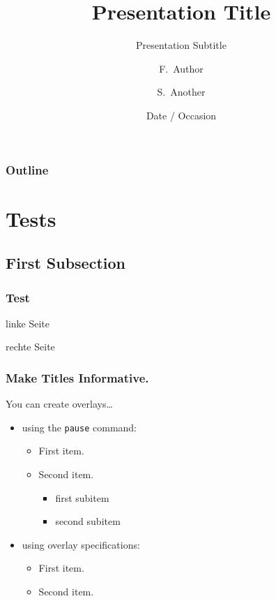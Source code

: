 \documentclass{beamer}
\title[Short Paper Title] %
{Presentation Title}
\subtitle{Presentation Subtitle} %
\author[Author, Another] %
{F.~Author\inst{1} \and S.~Another\inst{2}}
\institute[Universities of Somewhere and Elsewhere] %
{
  \inst{1}%
  Department of Computer Science\\
  University of Somewhere
  \and
  \inst{2}%
  Department of Theoretical Philosophy\\
  University of Elsewhere}
\date[Short Occasion] %
{Date / Occasion}
\begin{document}
\maketitle

\begin{frame}
  \frametitle{Outline}
  \tableofcontents
\end{frame}

\section{Tests}

\subsection{First Subsection}

\begin{frame}
  \frametitle{Test}
  \begin{minipage}{0.45\textwidth}
    \begin{block}{linke Seite}
      \vspace{3cm}
    \end{block}
  \end{minipage}
  \hfill
  \begin{minipage}{0.45\textwidth}
    \begin{block}{rechte Seite}
      \vspace{4cm}
    \end{block}
  \end{minipage}
\end{frame}

\begin{frame}
  \frametitle{Make Titles Informative.}

  You can create overlays\dots
  \begin{itemize}
  \item using the \texttt{pause} command:
    \begin{itemize}
    \item
      First item.
      \pause
    \item
      Second item.
      \begin{itemize}
        \item first subitem
        \item second subitem
      \end{itemize}
    \end{itemize}
  \item
    using overlay specifications:
    \begin{itemize}
    \item<3->
      First item.
    \item<4->
      Second item.
    \end{itemize}
  \end{itemize}
\end{frame}
\end{document}
